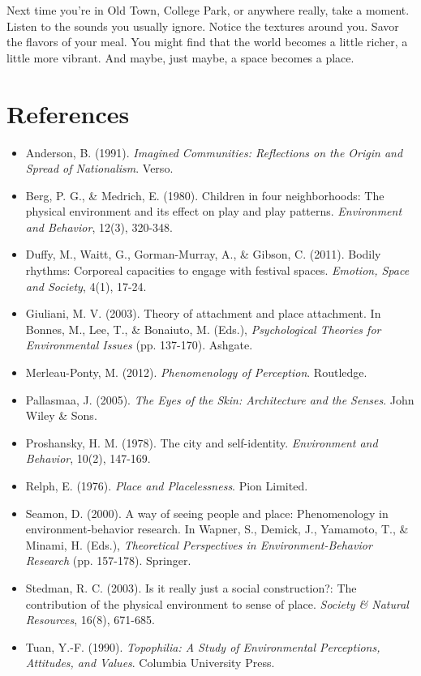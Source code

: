 \documentclass[12pt]{article}
\begin{document}
Next time you're in Old Town, College Park, or anywhere really, take a moment. Listen to the sounds you usually ignore. Notice the textures around you. Savor the flavors of your meal. You might find that the world becomes a little richer, a little more vibrant. And maybe, just maybe, a space becomes a place.

\newpage
\section*{References}

\begin{itemize}
    \item Anderson, B. (1991). \textit{Imagined Communities: Reflections on the Origin and Spread of Nationalism}. Verso.
    \item Berg, P. G., \& Medrich, E. (1980). Children in four neighborhoods: The physical environment and its effect on play and play patterns. \textit{Environment and Behavior}, 12(3), 320-348.
    \item Duffy, M., Waitt, G., Gorman-Murray, A., \& Gibson, C. (2011). Bodily rhythms: Corporeal capacities to engage with festival spaces. \textit{Emotion, Space and Society}, 4(1), 17-24.
    \item Giuliani, M. V. (2003). Theory of attachment and place attachment. In Bonnes, M., Lee, T., \& Bonaiuto, M. (Eds.), \textit{Psychological Theories for Environmental Issues} (pp. 137-170). Ashgate.
    \item Merleau-Ponty, M. (2012). \textit{Phenomenology of Perception}. Routledge.
    \item Pallasmaa, J. (2005). \textit{The Eyes of the Skin: Architecture and the Senses}. John Wiley \& Sons.
    \item Proshansky, H. M. (1978). The city and self-identity. \textit{Environment and Behavior}, 10(2), 147-169.
    \item Relph, E. (1976). \textit{Place and Placelessness}. Pion Limited.
    \item Seamon, D. (2000). A way of seeing people and place: Phenomenology in environment-behavior research. In Wapner, S., Demick, J., Yamamoto, T., \& Minami, H. (Eds.), \textit{Theoretical Perspectives in Environment-Behavior Research} (pp. 157-178). Springer.
    \item Stedman, R. C. (2003). Is it really just a social construction?: The contribution of the physical environment to sense of place. \textit{Society \& Natural Resources}, 16(8), 671-685.
    \item Tuan, Y.-F. (1990). \textit{Topophilia: A Study of Environmental Perceptions, Attitudes, and Values}. Columbia University Press.
\end{itemize}
\end{document}
